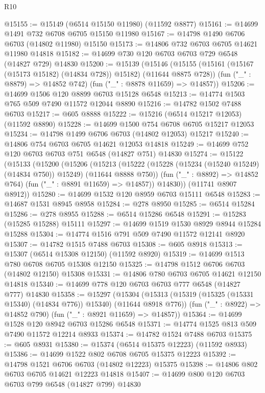 \begin{lexlean}{R10}
\begin{coremodule}
{{{{{{{{{{{{{{{{{{{{{{{{{{{{{{{{{{{{{{{{{{{{{{{{{{{{{{{{{{{{{{{{{{{{{{{{{{{{{{{{{{{{@15155 := @15149 (@6514 @15150 @11980) (@11592 @8877)
@15161 := @14699 @1491 @732 @6708 @6705 @15150 @11980
@15167 := @14798 @1490 @6706 @6703 (@14802 @11980) @15150
@15173 := @14806 @732 @6703 @6705 @14621 @11980 @14818
@15182 := @14699 @730 @120 @6703 @6703 @729 @6548 (@14827 @729) @14830
@15200 := @15139
    (@15146
      (@15155 (@15161 (@15167 (@15173 @15182) (@14834 @728)) @15182) (@11644 @8875 @728))
      (fun ("_" : @8879) => @14852 @742)
      (fun ("_" : @8878 @11659) => @14857))
@15206 := @14699 @1506 @120 @8899 @6703 @15128 @6548
@15213 := @14774 @1503 @765 @509 @7490 @11572 @12044 @8890
@15216 := @14782 @1502 @7488 @6703
@15217 := @605 @8888
@15222 := @15216 (@6514 @15217 @12053) (@11592 @8890)
@15228 := @14699 @1500 @754 @6708 @6705 @15217 @12053
@15234 := @14798 @1499 @6706 @6703 (@14802 @12053) @15217
@15240 := @14806 @754 @6703 @6705 @14621 @12053 @14818
@15249 := @14699 @752 @120 @6703 @6703 @751 @6548 (@14827 @751) @14830
@15274 := @15122
    (@15133
      (@15200
        (@15206
          (@15213
            (@15222 (@15228 (@15234 (@15240 @15249) (@14834 @750)) @15249) (@11644 @8888 @750))
            (fun ("_" : @8892) => @14852 @764)
            (fun ("_" : @8891 @11659) => @14857))
          @14830))
      (@11741 @8907 @8912))
@15280 := @14699 @1532 @120 @8959 @6703 @15111 @6548
@15283 := @14687 @1531 @8945 @8958
@15284 := @278 @8950
@15285 := @6514 @15284
@15286 := @278 @8955
@15288 := @6514 @15286 @6548
@15291 := @15283 (@15285 @15288) @15111
@15297 := @14699 @1519 @1530 @8929 @8944 @15284 @15288
@15304 := @14774 @1516 @791 @509 @7490 @11572 @12141 @8920
@15307 := @14782 @1515 @7488 @6703
@15308 := @605 @8918
@15313 := @15307 (@6514 @15308 @12150) (@11592 @8920)
@15319 := @14699 @1513 @780 @6708 @6705 @15308 @12150
@15325 := @14798 @1512 @6706 @6703 (@14802 @12150) @15308
@15331 := @14806 @780 @6703 @6705 @14621 @12150 @14818
@15340 := @14699 @778 @120 @6703 @6703 @777 @6548 (@14827 @777) @14830
@15358 := @15297
    (@15304
      (@15313 (@15319 (@15325 (@15331 @15340) (@14834 @776)) @15340) (@11644 @8918 @776))
      (fun ("_" : @8922) => @14852 @790)
      (fun ("_" : @8921 @11659) => @14857))
@15364 := @14699 @1528 @120 @8942 @6703 @15286 @6548
@15371 := @14774 @1525 @813 @509 @7490 @11572 @12214 @8933
@15374 := @14782 @1524 @7488 @6703
@15375 := @605 @8931
@15380 := @15374 (@6514 @15375 @12223) (@11592 @8933)
@15386 := @14699 @1522 @802 @6708 @6705 @15375 @12223
@15392 := @14798 @1521 @6706 @6703 (@14802 @12223) @15375
@15398 := @14806 @802 @6703 @6705 @14621 @12223 @14818
@15407 := @14699 @800 @120 @6703 @6703 @799 @6548 (@14827 @799) @14830
}}}}}}}}}}}}}}}}}}}}}}}}}}}}}}}}}}}}}}}}}}}}}}}}}}}}}}}}}}}}}}}}}}}}}}}}}}}}}}}}}}}}
\end{coremodule}
\end{lexlean}
